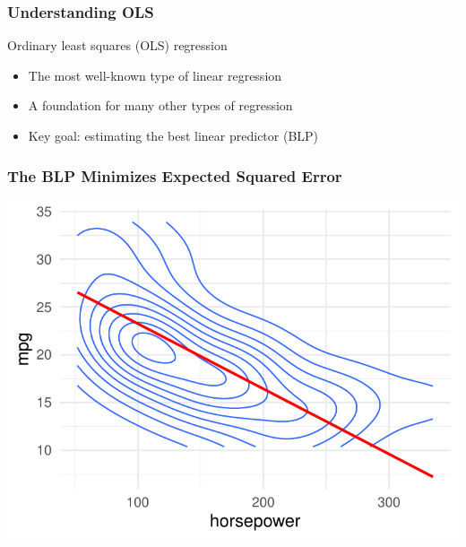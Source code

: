 \documentclass[12pt, block=fill]{beamer}
\begin{document}
\begin{frame}
  \frametitle{Understanding OLS}
  
  \begin{block}{Ordinary least squares (OLS) regression}
    \begin{itemize}
    \item The most well-known type of linear regression
    \item A foundation for many other types of regression
    \item Key goal: estimating the best linear predictor (BLP)
    \end{itemize}
  \end{block}
  
  
\end{frame}


\begin{frame}
  \frametitle{The BLP Minimizes Expected Squared Error}
  \includegraphics[width=\textwidth]{images/mpg_lm}
\end{frame}
\end{document}
